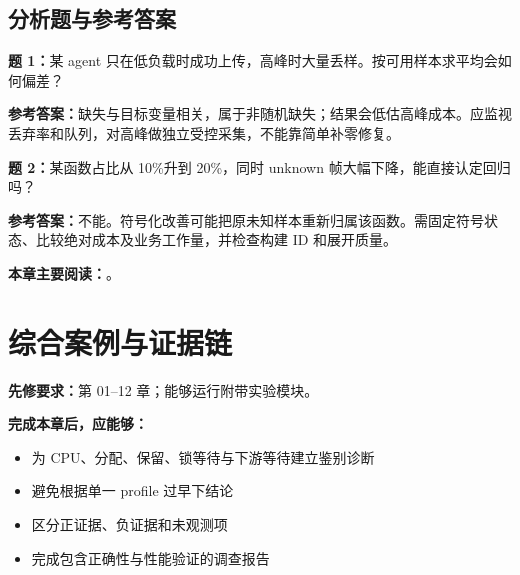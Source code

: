 \documentclass[UTF8,fontset=fandol,openany,11pt]{ctexbook}
\begin{document}
\section{分析题与参考答案}
\noindent\textbf{题 1：}某 agent 只在低负载时成功上传，高峰时大量丢样。按可用样本求平均会如何偏差？

\noindent\textbf{参考答案：}缺失与目标变量相关，属于非随机缺失；结果会低估高峰成本。应监视丢弃率和队列，对高峰做独立受控采集，不能靠简单补零修复。

\noindent\textbf{题 2：}某函数占比从 10\%升到 20\%，同时 unknown 帧大幅下降，能直接认定回归吗？

\noindent\textbf{参考答案：}不能。符号化改善可能把原未知样本重新归属该函数。需固定符号状态、比较绝对成本及业务工作量，并检查构建 ID 和展开质量。

\medskip\noindent\textbf{本章主要阅读：}\cite{go-diagnostics}\cite{go-http}\cite{go-pprof}\cite{tools-pprof}。
\chapter{综合案例与证据链}
\label{ch:13}
\par\medskip
\noindent\textbf{先修要求：}第 01–12 章；能够运行附带实验模块。

\noindent\textbf{完成本章后，应能够：}
\begin{itemize}
\item 为 CPU、分配、保留、锁等待与下游等待建立鉴别诊断
\item 避免根据单一 profile 过早下结论
\item 区分正证据、负证据和未观测项
\item 完成包含正确性与性能验证的调查报告
\end{itemize}
\end{document}
